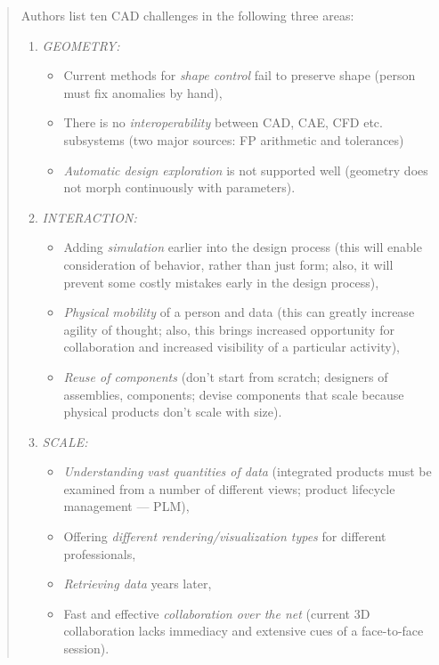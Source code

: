 		\begin{quote}
		\small
	    Authors list ten CAD challenges in the following three areas:
	    \begin{enumerate}
	    
	    \item
	    {\it GEOMETRY:}
	        \begin{itemize}
	        \item Current methods for \emph{shape control} fail to preserve shape (person must
	        fix anomalies by hand),
	        \item There is no \emph{interoperability} between CAD, CAE, CFD etc. subsystems
	        (two major sources: FP arithmetic and tolerances)
	        \item \emph{Automatic design exploration} is not supported well (geometry does not morph 
	        continuously with parameters).
	        \end{itemize}
	        
	    \item        
	    {\it INTERACTION:}     
	        \begin{itemize}
	        \item Adding {\em simulation} earlier into the design process (this will enable consideration
	        of behavior, rather than just form; also, it will prevent some costly mistakes early in
	        the design process),
	        \item {\em Physical mobility} of a person and data (this can greatly increase agility
	        of thought; also, this brings increased opportunity for collaboration and increased
	        visibility of a particular activity),
	        \item {\em Reuse of components} (don't start from scratch; designers of assemblies, components;
	        devise components that scale because physical products don't scale with size).
	        \end{itemize}
	        
	    \item
	    {\it SCALE:}
	        \begin{itemize} 
	        \item {\em Understanding vast quantities of data} (integrated products must be examined from
	        a number of different views; product lifecycle management --- PLM),
	        \item Offering {\em different rendering/visualization types} for different professionals,
	        \item {\em Retrieving data} years later,
	        \item Fast and effective {\em collaboration over the net} (current 3D collaboration lacks immediacy and
	        extensive cues of a face-to-face session).
	        \end{itemize}
	        
	    \end{enumerate}
		\end{quote}

